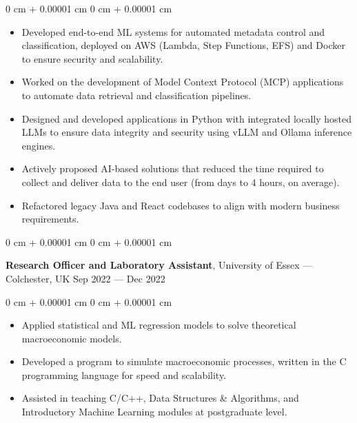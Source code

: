 \documentclass[10pt, letterpaper]{article}
\newenvironment{highlights}{
    \begin{itemize}[
        topsep=0.10 cm,
        parsep=0.10 cm,
        partopsep=0pt,
        itemsep=0pt,
        leftmargin=0 cm + 10pt
    ]
}{
    \end{itemize}
} %
\newenvironment{onecolentry}{
    \begin{adjustwidth}{
        0 cm + 0.00001 cm
    }{
        0 cm + 0.00001 cm
    }
}{
    \end{adjustwidth}
} %
\newenvironment{twocolentry}[2][]{
    \onecolentry
    \def\secondColumn{#2}
    \setcolumnwidth{\fill, 4.5 cm}
    \begin{paracol}{2}
}{
    \switchcolumn \raggedleft \secondColumn
    \end{paracol}
    \endonecolentry
} %
\begin{document}
        \vspace{0.10 cm}
        \begin{onecolentry}
            \begin{highlights}
            \item Developed end-to-end ML systems for automated metadata control and classification, deployed on AWS (Lambda, Step Functions, EFS) and Docker to ensure security and scalability.
              \item Worked on the development of Model Context Protocol (MCP) applications to automate data retrieval and classification pipelines.
              \item Designed and developed applications in Python with integrated locally hosted LLMs to ensure data integrity and security using vLLM and Ollama inference engines.
              \item Actively proposed AI-based solutions that reduced the time required to collect and deliver data to the end user (from days to 4 hours, on average).
              \item Refactored legacy Java and React codebases to align with modern business requirements.
            \end{highlights}
        \end{onecolentry}


        \vspace{0.2 cm}

        \begin{twocolentry}{
            Sep 2022 --- Dec 2022
        }
            \textbf{Research Officer and Laboratory Assistant}, University of Essex --- Colchester, UK\end{twocolentry}

        \vspace{0.10 cm}
        \begin{onecolentry}
            \begin{highlights}
            \item Applied statistical and ML regression models to solve theoretical macroeconomic models.
                  \item Developed a program to simulate macroeconomic processes, written in the C programming language for speed and scalability.
                  \item Assisted in teaching C/C++, Data Structures \& Algorithms, and Introductory Machine Learning modules at postgraduate level.
            \end{highlights}
        \end{onecolentry}
    
\end{document}
